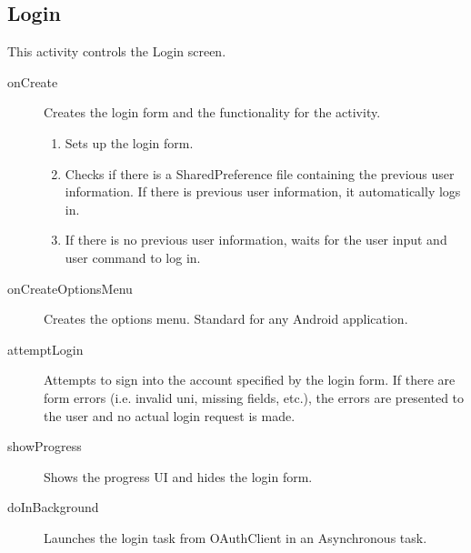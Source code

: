 \documentclass{article}
\begin{document}
\subsection{Login}
This activity controls the Login screen.
\begin{description}
    \item[onCreate] Creates the login form and the functionality for the activity. 
    \begin{enumerate}
        \item                   Sets up the login form.
        \item                   Checks if there is a SharedPreference file containing the 
                                previous user information. If there is previous user 
                                information, it automatically logs in.
        \item                   If there is no previous user information, waits for the 
                                user input and user command to log in.
    \end{enumerate}
    \item[onCreateOptionsMenu]  Creates the options menu. Standard for any Android 
                                application.
    \item[attemptLogin]         Attempts to sign into the account specified by the login 
                                form. If there are form errors (i.e. invalid uni, missing 
                                fields, etc.), the errors are presented to the user and no
                                actual login request is made.
    \item[showProgress]         Shows the progress UI and hides the login form.
    \item[doInBackground]       Launches the login task from OAuthClient in an 
                                Asynchronous task.
\end{description}

\end{document}
